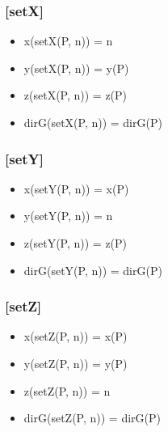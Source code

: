 \documentclass[11pt]{article}
\begin{document}
\subsubsection{[setX]}
\label{sec-1.6.3}

\begin{itemize}

\item x(setX(P, n)) = n\\
\label{sec-1.6.3.1}


\item y(setX(P, n)) = y(P)\\
\label{sec-1.6.3.2}


\item z(setX(P, n)) = z(P)\\
\label{sec-1.6.3.3}


\item dirG(setX(P, n)) = dirG(P)\\
\label{sec-1.6.3.4}


\end{itemize} %
\subsubsection{[setY]}
\label{sec-1.6.4}

\begin{itemize}

\item x(setY(P, n)) = x(P)\\
\label{sec-1.6.4.1}


\item y(setY(P, n)) = n\\
\label{sec-1.6.4.2}


\item z(setY(P, n)) = z(P)\\
\label{sec-1.6.4.3}


\item dirG(setY(P, n)) = dirG(P)\\
\label{sec-1.6.4.4}


\end{itemize} %
\subsubsection{[setZ]}
\label{sec-1.6.5}

\begin{itemize}

\item x(setZ(P, n)) = x(P)\\
\label{sec-1.6.5.1}


\item y(setZ(P, n)) = y(P)\\
\label{sec-1.6.5.2}


\item z(setZ(P, n)) = n\\
\label{sec-1.6.5.3}


\item dirG(setZ(P, n)) = dirG(P)\\
\label{sec-1.6.5.4}


\end{itemize} %
\end{document}
